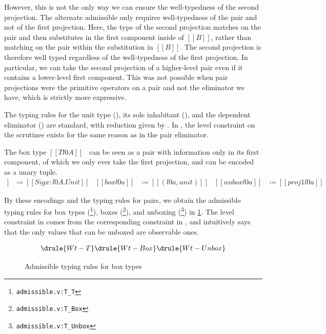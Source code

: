 \documentclass[acmsmall, screen=true, nonacm=true,
  review=\ifpublic false\else true\fi,
  anonymous=\ifanonymous true\else false\fi
]{acmart}
\newcommand{\suppl}[3]{{\scriptsize\texttt{#2:#3}}}
\begin{document}
However, this is not the only way we can ensure the well-typedness of the second projection.
The alternate admissible  only requires well-typedness of the pair
and not of the first projection.
Here, the type of the second projection matches on the pair
and then substitutes in the first component inside of $[[B]]$,
rather than matching on the pair within the substitution in $[[B]]$.
The second projection is therefore well typed regardless
of the well-typedness of the first projection.
In particular, we can take the second projection of a higher-level pair
even if it contains a lower-level first component.
This was not possible when pair projections were the primitive operators on a pair
and not the eliminator we have, which is strictly more expressive.

The typing rules for the unit type (),
its sole inhabitant (),
and the dependent eliminator () are standard,
with reduction given by .
In , the level constraint on the scrutinee exists
for the same reason as in the pair eliminator.

The box type $[[T l0 A]]$~\citep{abadi:dcc}
can be seen as a pair with information only in its first component,
of which we only ever take the first projection,
and can be encoded as a unary tuple.
%
{
\setlength{\abovedisplayskip}{0pt}
\setlength{\belowdisplayskip}{0pt}
\begin{align*}
  [[T l0 A]] &\coloneqq [[Sig x : l0 A . Unit]] &
  [[box l0 a]] &\coloneqq [[(l0 a, unit)]] &
  [[unbox l0 a]] &\coloneqq [[proj1 l0 a]]
\end{align*}
}

By these encodings and the typing rules for pairs,
we obtain the admissible typing rules for box types
(\footnote{\suppl{theories}{admissible.v}{T\_T}}),
boxes (\footnote{\suppl{theories}{admissible.v}{T\_Box}}),
and unboxing (\footnote{\suppl{theories}{admissible.v}{T\_Unbox}})
in \cref{fig:typing:box}.
The level constraint in  comes from the corresponding constraint in ,
and intuitively says that the only values that can be unboxed are observable ones.

\begin{figure}[h]
  \begin{gather*}
    \drule{Wt-T}
    \drule{Wt-Box}
    \drule{Wt-Unbox}
  \end{gather*}
  \caption{Admissible typing rules for box types}
  \Description{}
  \label{fig:typing:box}
\end{figure}
\end{document}
